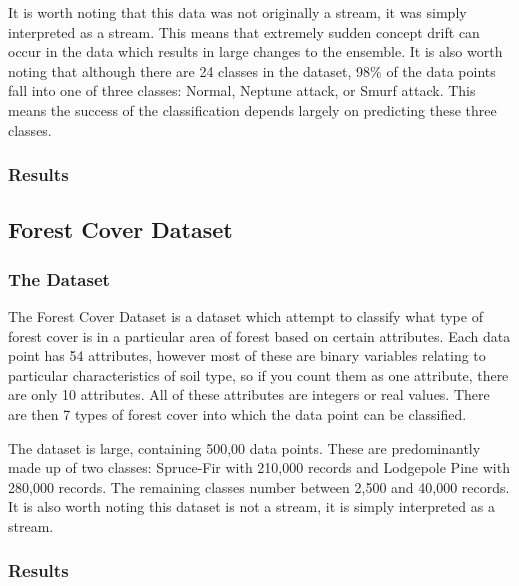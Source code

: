 \documentclass[12pt,a4paper,oneside]{report}
\begin{document}
It is worth noting that this data was not originally a stream, it was simply interpreted as a stream. This means that extremely sudden concept drift can occur in the data which results in large changes to the ensemble. It is also worth noting that although there are 24 classes in the dataset, 98\(\%\) of the data points fall into one of three classes: Normal, Neptune attack, or Smurf attack. This means the success of the classification depends largely on predicting these three classes. 
\subsubsection*{Results}

\subsection*{Forest Cover Dataset}
\subsubsection*{The Dataset}

The Forest Cover Dataset is a dataset which attempt to classify what type of forest cover is in a particular area of forest based on certain attributes. Each data point has 54 attributes, however most of these are binary variables relating to particular characteristics of soil type, so if you count them as one attribute, there are only 10 attributes. All of these attributes are integers or real values.  There are then 7 types of forest cover into which the data point can be classified. 

The dataset is large, containing 500,00 data points. These are predominantly made up of two classes: Spruce-Fir with 210,000 records and Lodgepole Pine with 280,000 records. The remaining classes number between 2,500 and 40,000 records. It is also worth noting this dataset is not a stream, it is simply interpreted as a stream. 


\subsubsection*{Results}
\end{document}
